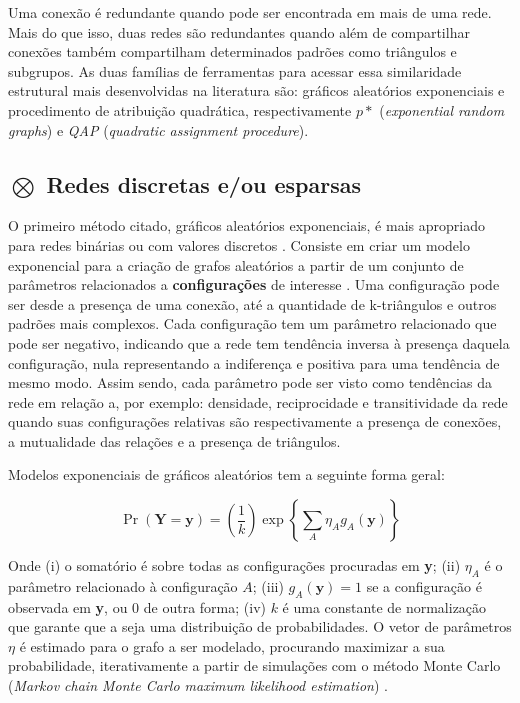 Uma conexão é redundante quando pode ser encontrada em mais de uma rede. Mais do
que isso, duas redes são redundantes quando além de compartilhar conexões também
compartilham determinados padrões como triângulos e subgrupos. As duas
famílias de ferramentas para acessar essa similaridade estrutural mais
desenvolvidas na literatura são: gráficos aleatórios exponenciais e procedimento
de atribuição quadrática, respectivamente $p*$ (\emph{exponential random
graphs}) e \emph{QAP} (\emph{quadratic assignment procedure}).

\subsection{$\bigotimes$ Redes discretas e/ou esparsas}

O primeiro método citado, gráficos aleatórios exponenciais, é mais apropriado
para redes binárias ou com valores discretos \citep{Dekker2007}. Consiste em
criar um modelo exponencial para a criação de grafos aleatórios a partir de um
conjunto de parâmetros relacionados a \textbf{configurações} de interesse
\citep{ROBINS2007a}. Uma configuração pode ser desde a presença de uma conexão,
até a quantidade de k-triângulos e outros padrões mais complexos. Cada
configuração tem um parâmetro relacionado que pode ser negativo, indicando que a
rede tem tendência inversa à presença daquela configuração, nula representando a
indiferença e positiva para uma tendência de mesmo modo. Assim sendo, cada
parâmetro pode ser visto como tendências da rede em relação a, por exemplo:
densidade, reciprocidade e transitividade da rede quando suas configurações
relativas são respectivamente a presença de conexões, a mutualidade das relações
e a presença de triângulos.

Modelos exponenciais de gráficos aleatórios tem a seguinte forma geral:

\begin{equation}
\label{def:p_star_geral}
\Pr(\textbf{Y} = \textbf{y})
=\left(\frac{1}{k}\right)\exp\left\{\sum_A\eta_Ag_A(\textbf{y})\right\}
\end{equation}

Onde (i) o somatório é sobre todas as configurações procuradas em \textbf{y};
(ii) $\eta_A$ é o parâmetro relacionado à configuração $A$; (iii)
$g_A(\textbf{y})=1$ se a configuração é observada em \textbf{y}, ou 0 de outra
forma; (iv) $k$ é uma constante de normalização que garante que
a  seja uma distribuição de probabilidades. O vetor de
parâmetros $\eta$ é estimado para o grafo a ser modelado, procurando maximizar
a sua probabilidade, iterativamente a partir de simulações com o método Monte
Carlo (\emph{Markov chain Monte Carlo maximum likelihood estimation})
\citep{ROBINS2007b, Snijders2006}.


